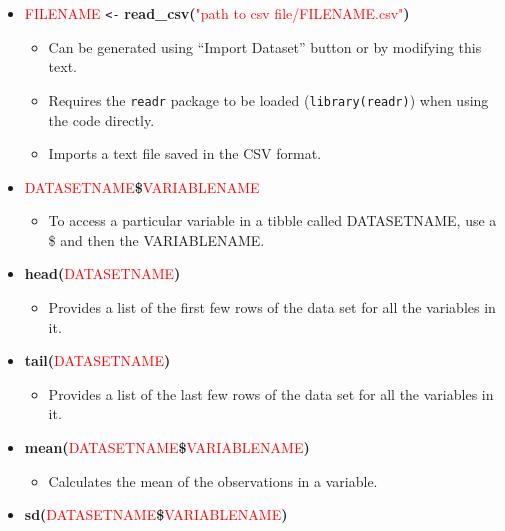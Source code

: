 \documentclass[
]{book}
\providecommand{\tightlist}{%
  \setlength{\itemsep}{0pt}\setlength{\parskip}{0pt}}
\begin{document}
\begin{itemize}
\item
  \textcolor{red}{FILENAME} \texttt{\textless{}-} \textbf{read\_csv(}\textcolor{red}{"path to csv file/FILENAME.csv"}\textbf{)}

  \begin{itemize}
  \item
    Can be generated using ``Import Dataset'' button or by modifying this text.
  \item
    Requires the \texttt{readr} package to be loaded (\texttt{library(readr)}) when using
    the code directly.
  \item
    Imports a text file saved in the CSV format.
  \end{itemize}
\item
  \textcolor{red}{DATASETNAME}\textbf{\$}\textcolor{red}{VARIABLENAME}

  \begin{itemize}
  \tightlist
  \item
    To access a particular variable in a tibble called DATASETNAME, use
    a \$ and then the VARIABLENAME.
  \end{itemize}
\item
  \textbf{head(}\textcolor{red}{DATASETNAME}\textbf{)}

  \begin{itemize}
  \tightlist
  \item
    Provides a list of the first few rows of the data set for all the
    variables in it. 
  \end{itemize}
\item
  \textbf{tail(}\textcolor{red}{DATASETNAME}\textbf{)}

  \begin{itemize}
  \tightlist
  \item
    Provides a list of the last few rows of the data set for all the
    variables in it. 
  \end{itemize}
\item
  \textbf{mean(}\textcolor{red}{DATASETNAME}\textbf{\$}\textcolor{red}{VARIABLENAME}\textbf{)}

  \begin{itemize}
  \tightlist
  \item
    Calculates the mean of the observations in a variable.
  \end{itemize}
\item
  \textbf{sd(}\textcolor{red}{DATASETNAME}\textbf{\$}\textcolor{red}{VARIABLENAME}\textbf{)}


\end{itemize}
\end{document}
